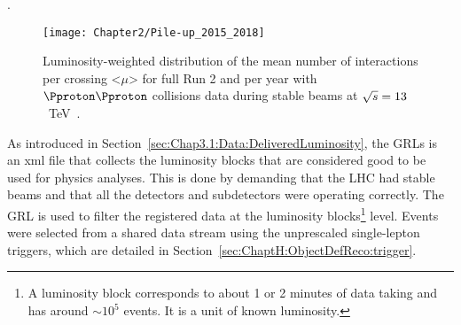 \begin{table}[h]
\centering
{}
\caption{Peak luminosity, integrated luminosity delivered by the LHC and 
cumulative luminosity collected by the ATLAS detector at $\CM = 13\,$TeV during Run 2 per year~\cite{ATLAS:CONF:2019:021}}. 
\label{tab:ChaptH:Data:lumi}
\end{table}

\begin{figure}[h]
	\centering
 	 \texttt{[image: Chapter2/Pile-up\_2015\_2018]}
	 \caption{Luminosity-weighted distribution of the mean number of interactions 
	 per crossing <$\mu$> for full Run 2 and per year with $\Pproton \Pproton$ collisions data during stable beams at $\sqrt{s}=13$~TeV~\cite{ATLAS:2022hro}.}
	\label{fig:Chap6:LHC:PileUp_15-18}
\end{figure}

As introduced in Section~\ref{sec:Chap3.1:Data:DeliveredLuminosity}, the GRLs is an xml file that collects the luminosity blocks that are considered good
to be used for physics analyses. This is done by demanding that the LHC had stable beams and that all
the detectors and subdetectors were operating correctly.
The GRL is used to filter the registered data at the luminosity blocks\footnote{A
luminosity block corresponds to about 1 or 2 minutes of data taking and has around $\sim10^{5}$ events. 
It is a unit of known luminosity.} level. %
Events were selected from a shared data stream using the unprescaled single-lepton triggers, 
which are detailed in Section~\ref{sec:ChaptH:ObjectDefReco:trigger}.


